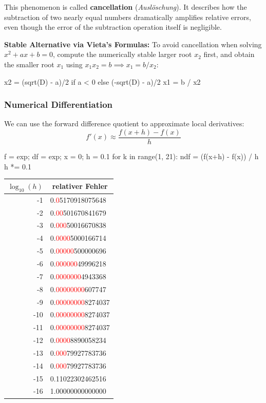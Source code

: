 \begin{definition} 
    This phenomenon is called \textbf{cancellation} (\textit{Auslöschung}). It describes how the subtraction of two nearly equal numbers dramatically amplifies relative errors, even though the error of the subtraction operation itself is negligible.
\end{definition}  

\begin{remark}
    \textbf{Stable Alternative via Vieta's Formulas:} To avoid cancellation when solving $x^2 + ax + b = 0$, compute the numerically stable larger root $x_2$ first, and obtain the smaller root $x_1$ using $x_1 x_2 = b \implies x_1 = b / x_2$:
\end{remark}

\begin{codeexample}
x2 = (sqrt(D) - a)/2 if a < 0 else (-sqrt(D) - a)/2
x1 = b / x2
\end{codeexample}

\subsubsection{Numerical Differentiation}  

\begin{remark} 
    We can use the forward difference quotient to approximate local derivatives: $$f'(x) \approx \frac{f(x+h)-f(x)}{h}$$
\end{remark}  

\begin{codeexample}
f = exp; df = exp; x = 0; h = 0.1
for k in range(1, 21):
    ndf = (f(x+h) - f(x)) / h
    h *= 0.1
\end{codeexample}  

\begin{tabular*}{\textwidth}{@{\extracolsep{\fill}} r l }
$\log_{10}(h)$ & \multicolumn{1}{c}{relativer Fehler} \\ \hline
-1 & 0.\textcolor{red}{0}5170918075648 \\
-2 & 0.\textcolor{red}{00}501670841679 \\
-3 & 0.\textcolor{red}{000}50016670838 \\
-4 & 0.\textcolor{red}{0000}5000166714 \\
-5 & 0.\textcolor{red}{00000}500000696 \\
-6 & 0.\textcolor{red}{000000}49996218 \\
-7 & 0.\textcolor{red}{0000000}4943368 \\
-8 & 0.\textcolor{red}{00000000}607747 \\
-9 & 0.\textcolor{red}{00000000}8274037 \\
-10 & 0.\textcolor{red}{00000000}8274037 \\
-11 & 0.\textcolor{red}{00000000}8274037 \\
-12 & 0.\textcolor{red}{0000}8890058234 \\
-13 & 0.\textcolor{red}{000}79927783736 \\
-14 & 0.\textcolor{red}{000}79927783736 \\
-15 & 0.11022302462516 \\
-16 & 1.00000000000000 \\
\end{tabular*}  

